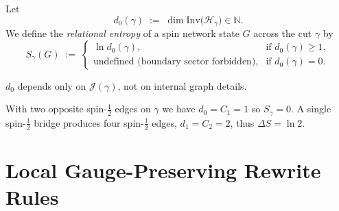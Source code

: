 \documentclass[11pt]{article}
\newcommand{\Hil}{\mathcal{H}}
\newcommand{\Inv}{\mathrm{Inv}}
\newcommand{\Cut}{\gamma}
\newcommand{\JS}{\mathcal{J}} %
\begin{document}
\begin{definition}\label{def:entropy}
Let
\[
  d_0(\Cut)\;:=\;
  \dim\Inv\!\bigl(\Hil_{\Cut}\bigr)
  \in\mathbb{N}.
\]
We define the \emph{relational entropy} of a spin network state
\(G\) across the cut \(\Cut\) by
\[
  S_{\Cut}(G)\;:=\;
  \begin{cases}
    \ln d_0(\Cut), & \text{if } d_0(\Cut)\ge 1, \\[6pt]
    \text{undefined (boundary sector forbidden),} & \text{if } d_0(\Cut)=0.
  \end{cases}
\]
\end{definition}

\begin{remark} $d_0$ depends only on $\JS(\Cut)$, not on internal graph details. \end{remark}

\begin{example}\label{ex:toy} With two opposite spin-$\tfrac12$ edges on $\Cut$ we have $d_0=C_1=1$ so $S_{\Cut}=0$. A single spin-$\tfrac12$ bridge produces four spin-$\tfrac12$ edges, $d_1=C_2=2$, thus $\Delta S=\ln2$. \end{example}


\section{Local Gauge-Preserving Rewrite Rules}\label{sec:rewrites}
\end{document}
